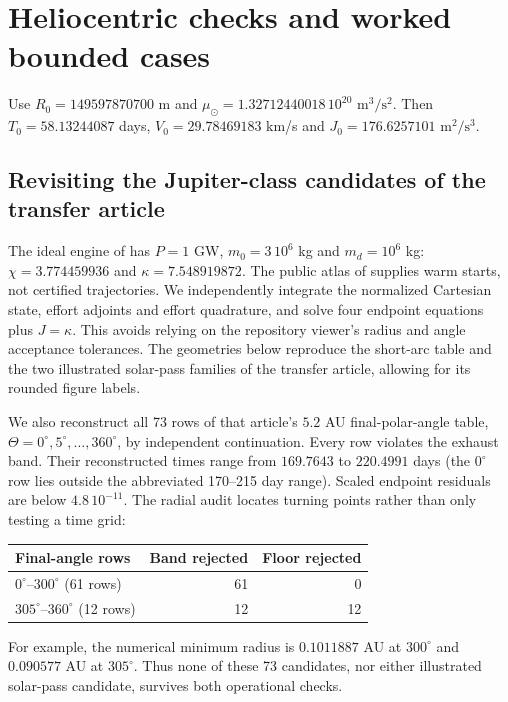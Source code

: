 \section{Heliocentric checks and worked bounded cases}
\label{sec:helio}
Use $R_0=149597870700$ m and
$\mu_\odot=1.32712440018\,10^{20}$ $\mathrm{m^3/s^2}$.
Then $T_0=58.13244087$ days, $V_0=29.78469183$ km/s and
$J_0=176.6257101$ $\mathrm{m^2/s^3}$.

\subsection{Revisiting the Jupiter-class candidates of the transfer article}
The ideal engine of \cite{OriginalKepler} has $P=1$ GW, $m_0=3\,10^6$ kg and
$m_d=10^6$ kg: $\chi=3.774459936$ and $\kappa=7.548919872$.
The public atlas of \cite{OriginalKepler} supplies warm starts, not
certified trajectories. We independently integrate the normalized Cartesian state,
effort adjoints and effort quadrature, and solve four endpoint equations
plus $J=\kappa$. This avoids relying on the repository viewer's radius
and angle acceptance tolerances. The geometries below reproduce the
short-arc table and the two illustrated solar-pass families of the
transfer article, allowing for its rounded figure labels.



We also reconstruct all 73 rows of that article's $5.2$ AU final-polar-angle
table, $\Theta=0^\circ,5^\circ,\ldots,360^\circ$, by independent continuation.
Every row violates the exhaust band. Their reconstructed times range from
$169.7643$ to $220.4991$ days (the $0^\circ$ row lies outside the abbreviated
170--215 day range). Scaled endpoint residuals are below $4.8\,10^{-11}$.
The radial audit locates turning points rather than only testing a time grid:
\begin{center}\small
\begin{tabular}{lrr}\toprule
Final-angle rows&Band rejected&Floor rejected\\\midrule
$0^\circ$--$300^\circ$ (61 rows)&61&0\\
$305^\circ$--$360^\circ$ (12 rows)&12&12\\\bottomrule
\end{tabular}\end{center}
For example, the numerical minimum radius is $0.1011887$ AU at $300^\circ$
and $0.090577$ AU at $305^\circ$. Thus none of these 73 candidates, nor
either illustrated solar-pass candidate, survives both operational checks.

